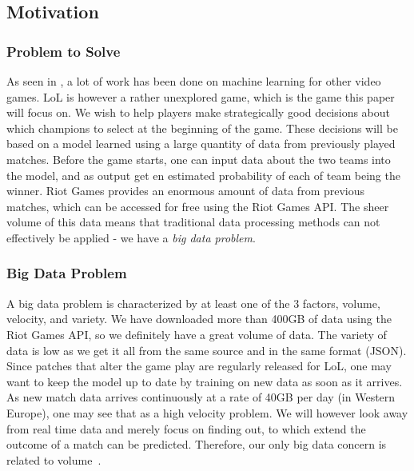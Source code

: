 \subsection{Motivation}\label{sec:motivation}

\subsubsection{Problem to Solve} %
\label{sec:problem_to_solve}
As seen in , a lot of work has been done on machine learning for other video games. LoL is however a rather unexplored game, which is the game this paper will focus on. We wish to help players make strategically good decisions about which champions to select at the beginning of the game.
These decisions will be based on a model learned using a large quantity of data from previously played matches. Before the game starts, one can input data about the two teams into the model, and as output get en estimated probability of each of team being the winner.
Riot Games provides an enormous amount of data from previous matches, which can be accessed for free using the Riot Games API.
The sheer volume of this data means that traditional data processing methods can not effectively be applied - we have a \emph{big data problem}. 


\subsubsection{Big Data Problem} %
\label{sec:big_data_problem}

A big data problem is characterized by at least one of the 3 factors, volume, velocity, and variety. We have downloaded more than 400GB of data using the Riot Games API, so we definitely have a great volume of data. The variety of data is low as we get it all from the same source and in the same format (JSON). Since patches that alter the game play are regularly released for LoL, one may want to keep the model up to date by training on new data as soon as it arrives. As new match data arrives continuously at a rate of 40GB per day (in Western Europe), one may see that as a high velocity problem. We will however look away from real time data and merely focus on finding out, to which extend the outcome of a match can be predicted. Therefore, our only big data concern is related to volume~\cite{madden2012databases}.

